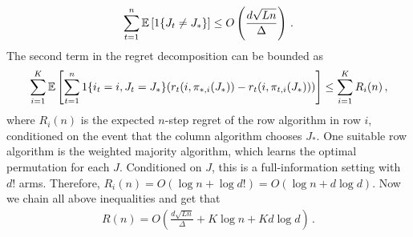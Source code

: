 \begin{align*}
  \sum_{t = 1}^n \mathbb{E}\left[1\{J_t \neq J_\ast\}\right] \leq
 O \left(  \frac{d \sqrt{L n}}{\Delta} \right) \,.
\end{align*}
The second term in the regret decomposition can be bounded as
\begin{align*}
  \sum_{i = 1}^K \mathbb{E}\left[\sum_{t = 1}^n 1\{i_t = i, J_t = J_\ast\} (r_t(i, \pi_{\ast, i}(J_\ast)) - r_t(i, \pi_{t, i}(J_\ast)))\right] \leq
  \sum_{i = 1}^K R_i(n)\,,
\end{align*}
where $R_i(n)$ is the expected $n$-step regret of the row algorithm in row $i$, conditioned on the event that the column algorithm chooses $J_\ast$. One suitable row algorithm is the weighted majority algorithm, which learns the optimal permutation for each $J$. Conditioned on $J$, this is a full-information setting with $d!$ arms. Therefore, $R_i(n) = O(\log n + \log d!) = O(\log n + d \log d)$. Now we chain all above inequalities and get that
\begin{align*}
  R(n) = O\left(\frac{d \sqrt{L n}}{\Delta} + K \log n + K d \log d\right)\,.
\end{align*}


